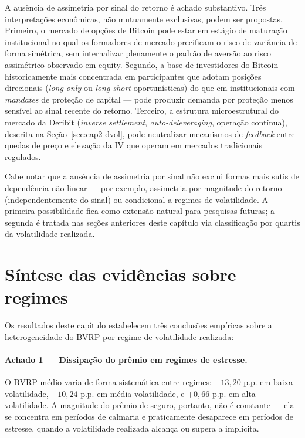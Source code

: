 A ausência de assimetria por sinal do retorno é achado substantivo. Três interpretações econômicas, não mutuamente exclusivas, podem ser propostas. Primeiro, o mercado de opções de Bitcoin pode estar em estágio de maturação institucional no qual os formadores de mercado precificam o risco de variância de forma simétrica, sem internalizar plenamente o padrão de aversão ao risco assimétrico observado em equity. Segundo, a base de investidores do Bitcoin --- historicamente mais concentrada em participantes que adotam posições direcionais (\textit{long-only} ou \textit{long-short} oportunísticas) do que em institucionais com \textit{mandates} de proteção de capital --- pode produzir demanda por proteção menos sensível ao sinal recente do retorno. Terceiro, a estrutura microestrutural do mercado da Deribit (\textit{inverse settlement}, \textit{auto-deleveraging}, operação contínua), descrita na Seção~\ref{sec:cap2-dvol}, pode neutralizar mecanismos de \textit{feedback} entre quedas de preço e elevação da IV que operam em mercados tradicionais regulados.

Cabe notar que a ausência de assimetria por sinal não exclui formas mais sutis de dependência não linear --- por exemplo, assimetria por magnitude do retorno (independentemente do sinal) ou condicional a regimes de volatilidade. A primeira possibilidade fica como extensão natural para pesquisas futuras; a segunda é tratada nas seções anteriores deste capítulo via classificação por quartis da volatilidade realizada.

\section{Síntese das evidências sobre regimes}
\label{sec:cap9_sintese}

Os resultados deste capítulo estabelecem três conclusões empíricas sobre a heterogeneidade do BVRP por regime de volatilidade realizada:

\paragraph{Achado 1 --- Dissipação do prêmio em regimes de estresse.} O BVRP médio varia de forma sistemática entre regimes: $-13{,}20$ p.p. em baixa volatilidade, $-10{,}24$ p.p. em média volatilidade, e $+0{,}66$ p.p. em alta volatilidade. A magnitude do prêmio de seguro, portanto, não é constante --- ela se concentra em períodos de calmaria e praticamente desaparece em períodos de estresse, quando a volatilidade realizada alcança ou supera a implícita.

